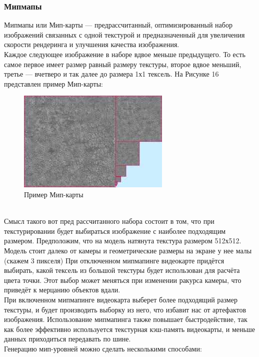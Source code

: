 \documentclass[a4paper, 10pt]{article}
\begin{document}
	\subsubsection{Мипмапы}
	\hspace*{5mm}Мипмапы или Мип-карты  — предрассчитанный, оптимизированный набор изображений связанных с одной текстурой и предназначенный для увеличения скорости рендеринга и улучшения качества изображения.\cite{mm}
	\\ \hspace*{5mm}Каждое следующее изображение в наборе вдвое меньше предыдущего. То есть самое первое имеет размер равный размеру текстуры, второе вдвое меньший, третье — вчетверо и так далее до размера 1х1 тексель. На Рисунке 16  представлен пример Мип-карты:
	\begin{figure}[h!]
		\centering
		\includegraphics[scale=0.8]{mipmap}
		\centering\caption{Пример Мип-карты}
	\end{figure}
	\\ \hspace*{5mm} Смысл такого вот пред рассчитанного набора состоит в том, что при текстурировании будет выбираться изображение с наиболее подходящим размером.
	Предположим, что на модель натянута текстура размером 512х512. Модель стоит далеко от камеры и геометрические размеры на экране у нее малы (скажем 3 пикселя)
	При отключенном мипмапинге видеокарте придётся выбирать, какой тексель из большой текстуры будет использован для расчёта цвета точки. Этот выбор может меняться при изменении ракурса камеры, что приведёт к мерцанию объектов вдали.
	\\ \hspace*{5mm} При включенном мипмапинге видеокарта выберет более подходящий размер текстуры, и будет производить выборку из него, что избавит нас от артефактов изображения. Использование мипмапинга также повышает быстродействие, так как более эффективно используется текстурная кэш-память видеокарты, и меньше данных приходиться передавать по шине.
	\newline\\ Генерацию мип-уровней можно сделать несколькими способами:
\end{document}
